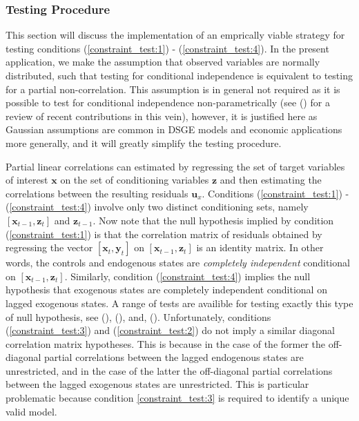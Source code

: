 \documentclass{article}
\begin{document}
\subsubsection{Testing Procedure} \label{testing}

This section will discuss the implementation of an emprically viable strategy for testing conditions (\ref{constraint_test:1}) - (\ref{constraint_test:4}). In the present application, we make the assumption that observed variables are normally distributed, such that testing for conditional independence is equivalent to testing for a partial non-correlation. This assumption is in general not required as it is possible to test for conditional independence non-parametrically (see \citeauthor{strobl2019approximate} (\citeyear{strobl2019approximate}) for a review of recent contributions in this vein), however, it is justified here as Gaussian assumptions are common in DSGE models and economic applications more generally, and it will greatly simplify the testing procedure. 

Partial linear correlations can estimated by regressing the set of target variables of interest $\mathbf{x}$ on the set of conditioning variables $\mathbf{z}$ and then estimating the correlations between the resulting residuals $\mathbf{u}_x$. Conditions (\ref{constraint_test:1}) - (\ref{constraint_test:4}) involve only two distinct conditioning sets, namely $[\mathbf{x}_{t-1},\mathbf{z}_t]$ and $\mathbf{z}_{t-1}$. Now note that the null hypothesis implied by condition (\ref{constraint_test:1}) is that the correlation matrix of residuals obtained by regressing the vector $[\mathbf{x}_t, \mathbf{y}_t]$ on $[\mathbf{x}_{t-1},\mathbf{z}_t]$ is an identity matrix. In other words, the controls and endogenous states are \textit{completely independent} conditional on $[\mathbf{x}_{t-1},\mathbf{z}_t]$. Similarly, condition (\ref{constraint_test:4}) implies the null hypothesis that exogenous states are completely independent conditional on lagged exogenous states. A range of tests are availible for testing exactly this type of null hypothesis, see \citeauthor{schott2005testing} (\citeyear{schott2005testing}), \citeauthor{srivastava2005some} (\citeyear{srivastava2005some}), and, \citeauthor{wang2015conditional} (\citeyear{wang2015conditional}). Unfortunately, conditions (\ref{constraint_test:3}) and (\ref{constraint_test:2}) do not imply a similar diagonal correlation matrix hypotheses. This is because in the case of the former the off-diagonal partial correlations between the lagged endogenous states are unrestricted, and in the case of the latter the off-diagonal partial correlations between the lagged exogenous states are unrestricted. This is particular problematic because condition \ref{constraint_test:3} is required to identify a unique valid model. 
\end{document}
